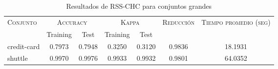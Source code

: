 \begin{table}[]
\centering
\begin{tabular}{l c c c c c c}
\hline
\multirow{2}{*}{\textsc{Conjunto}}
	& \multicolumn{2}{c}{\textsc{Accuracy}}
	& \multicolumn{2}{c}{\textsc{Kappa}}
	& \textsc{Reducción}
	& \textsc{Tiempo promedio (seg)} \\
	& Training & Test
	& Training & Test \\ 
\hline
\hline

credit-card & 0.7973 & 0.7948 & 0.3250 & 0.3120 & 0.9836 & 18.1931 \\
shuttle & 0.9970 & 0.9976 & 0.9933 & 0.9932 & 0.9801 & 64.0352 \\

\hline
\end{tabular}
\caption{Resultados de RSS-CHC para conjuntos grandes }
\label{res-grande-RSS-CHC}
\end{table}

